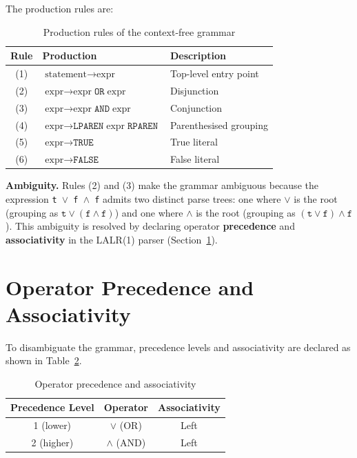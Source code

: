 The production rules are:

\begin{table}[H]
\centering
\caption{Production rules of the context-free grammar}
\label{table:grammar_rules}
\begin{tabular}{@{}cll@{}}
\toprule
Rule & Production & Description \\
\midrule
(1) & $\text{statement} \rightarrow \text{expr}$                        & Top-level entry point \\
(2) & $\text{expr} \rightarrow \text{expr}\;\texttt{OR}\;\text{expr}$   & Disjunction \\
(3) & $\text{expr} \rightarrow \text{expr}\;\texttt{AND}\;\text{expr}$  & Conjunction \\
(4) & $\text{expr} \rightarrow \texttt{LPAREN}\;\text{expr}\;\texttt{RPAREN}$ & Parenthesised grouping \\
(5) & $\text{expr} \rightarrow \texttt{TRUE}$                           & True literal \\
(6) & $\text{expr} \rightarrow \texttt{FALSE}$                          & False literal \\
\bottomrule
\end{tabular}
\end{table}

\textbf{Ambiguity.} Rules (2) and (3) make the grammar ambiguous because the expression \texttt{t $\vee$ f $\wedge$ f} admits two distinct parse trees: one where $\vee$ is the root (grouping as $\texttt{t} \vee (\texttt{f} \wedge \texttt{f})$) and one where $\wedge$ is the root (grouping as $(\texttt{t} \vee \texttt{f}) \wedge \texttt{f}$). This ambiguity is resolved by declaring operator \textbf{precedence} and \textbf{associativity} in the LALR(1) parser (Section~\ref{sec:precedence}).

\section{Operator Precedence and Associativity}
\label{sec:precedence}

To disambiguate the grammar, precedence levels and associativity are declared as shown in Table~\ref{table:precedence}.

\begin{table}[H]
\centering
\caption{Operator precedence and associativity}
\label{table:precedence}
\begin{tabular}{@{}ccc@{}}
\toprule
Precedence Level & Operator & Associativity \\
\midrule
1 (lower)  & $\vee$ (OR)  & Left \\
2 (higher) & $\wedge$ (AND) & Left \\
\bottomrule
\end{tabular}
\end{table}

